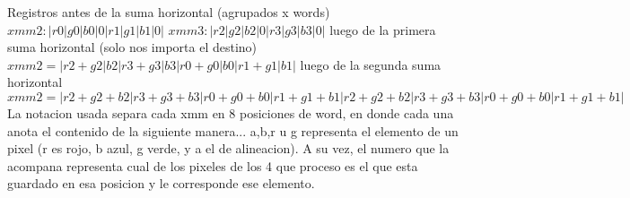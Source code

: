 \documentclass[a4paper]{article}
\begin{document}
   Registros antes de la suma horizontal (agrupados x words)
   \hfill \break
  $ xmm2 :| r0 | g0 | b0 | 0 | r1 | g1 | b1 | 0 | $
  $ xmm3 :| r2 | g2 | b2 | 0 | r3 | g3 | b3 | 0 |$
   \hfill \break
   luego de la primera suma horizontal (solo nos importa el destino)
   \hfill \break
   $xmm2 = | r2+g2 | b2 | r3+g3 | b3 | r0+g0 | b0 | r1+g1 | b1 |$
   \hfill \break
   luego de la segunda suma horizontal 
   \hfill \break
   $xmm2 = | r2+g2+b2 | r3+g3+b3 | r0+g0+b0 | r1+g1+b1 | r2+g2+b2 | r3+g3+b3 | r0+g0+b0 | r1+g1+b1 |$
   \hfill \break
   \\
   La notacion usada separa cada xmm en 8 posiciones de word, en donde cada una anota el contenido de la siguiente manera... a,b,r u g representa el elemento de un pixel (r es rojo, b azul, g verde, y a el de alineacion). A su vez, el numero que la acompana  representa cual de los pixeles de los 4 que proceso es el que esta guardado en esa posicion y le corresponde ese elemento.
   \hfill \break
   \\
   
\end{document}
